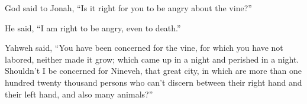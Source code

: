  God said to Jonah, ``Is it right for you to be angry
about the vine?''

He said, ``I am right to be angry, even to death.''

 Yahweh said, ``You have been concerned for the vine, for
which you have not labored, neither made it grow; which came up in a
night and perished in a night.  Shouldn't I be concerned
for Nineveh, that great city, in which are more than one hundred twenty
thousand persons who can't discern between their right hand and their
left hand, and also many animals?''
